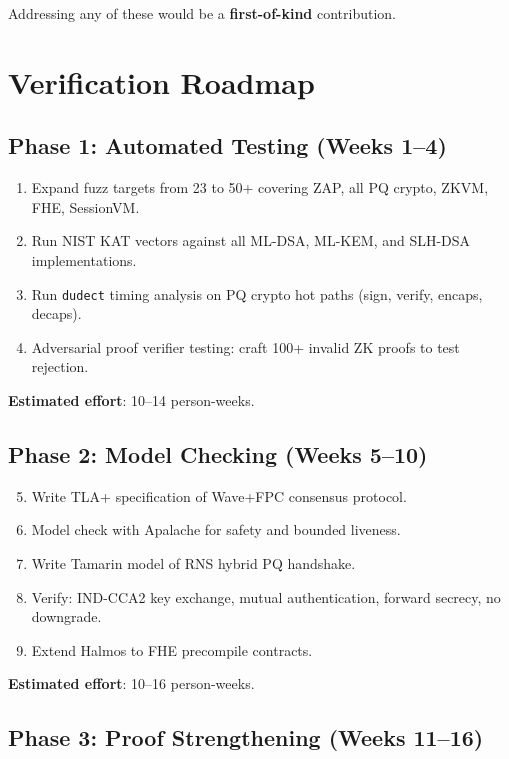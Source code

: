 \documentclass[11pt,letterpaper]{article}
\begin{document}
Addressing any of these would be a \textbf{first-of-kind} contribution.

\section{Verification Roadmap}

\subsection{Phase 1: Automated Testing (Weeks 1--4)}

\begin{enumerate}
\item Expand fuzz targets from 23 to 50+ covering ZAP, all PQ crypto, ZKVM, FHE, SessionVM.
\item Run NIST KAT vectors against all ML-DSA, ML-KEM, and SLH-DSA implementations.
\item Run \texttt{dudect} timing analysis on PQ crypto hot paths (sign, verify, encaps, decaps).
\item Adversarial proof verifier testing: craft 100+ invalid ZK proofs to test rejection.
\end{enumerate}

\textbf{Estimated effort}: 10--14 person-weeks.

\subsection{Phase 2: Model Checking (Weeks 5--10)}

\begin{enumerate}
\setcounter{enumi}{4}
\item Write TLA+ specification of Wave+FPC consensus protocol.
\item Model check with Apalache for safety and bounded liveness.
\item Write Tamarin model of RNS hybrid PQ handshake.
\item Verify: IND-CCA2 key exchange, mutual authentication, forward secrecy, no downgrade.
\item Extend Halmos to FHE precompile contracts.
\end{enumerate}

\textbf{Estimated effort}: 10--16 person-weeks.

\subsection{Phase 3: Proof Strengthening (Weeks 11--16)}
\end{document}
